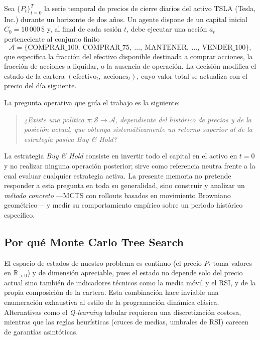 Sea $\{P_t\}_{t=0}^{T}$ la serie temporal de precios de cierre diarios del activo TSLA (Tesla, Inc.) durante un horizonte de dos años. Un agente dispone de un capital inicial $C_0 = 10\,000$\,\$ y, al final de cada sesión $t$, debe ejecutar una acción $a_t$ perteneciente al conjunto finito
\[
    \mathcal{A} = \{\text{COMPRAR\_100},\ \text{COMPRAR\_75},\ \ldots,\ \text{MANTENER},\ \ldots,\ \text{VENDER\_100}\},
\]
que especifica la fracción del efectivo disponible destinada a comprar acciones, la fracción de acciones a liquidar, o la ausencia de operación. La decisión modifica el estado de la cartera $(\text{efectivo}_t,\ \text{acciones}_t)$, cuyo valor total se actualiza con el precio del día siguiente.

La pregunta operativa que guía el trabajo es la siguiente:

\begin{quote}
    \itshape ¿Existe una política $\pi: \mathcal{S} \to \mathcal{A}$, dependiente del histórico de precios y de la posición actual, que obtenga sistemáticamente un retorno superior al de la estrategia pasiva \emph{Buy \& Hold}?
\end{quote}

La estrategia \emph{Buy \& Hold} consiste en invertir todo el capital en el activo en $t=0$ y no realizar ninguna operación posterior; sirve como referencia neutra frente a la cual evaluar cualquier estrategia activa. La presente memoria no pretende responder a esta pregunta en toda su generalidad, sino construir y analizar un \emph{método concreto} ---MCTS con rollouts basados en movimiento Browniano geométrico--- y medir su comportamiento empírico sobre un periodo histórico específico.

\subsection{Por qué Monte Carlo Tree Search}
\label{subsec:por-que-mcts}

El espacio de estados de nuestro problema es continuo (el precio $P_t$ toma valores en $\mathbb{R}_{>0}$) y de dimensión apreciable, pues el estado no depende solo del precio actual sino también de indicadores técnicos como la media móvil y el RSI, y de la propia composición de la cartera. Esta combinación hace inviable una enumeración exhaustiva al estilo de la programación dinámica clásica. Alternativas como el \emph{Q-learning} tabular requieren una discretización costosa, mientras que las reglas heurísticas (cruces de medias, umbrales de RSI) carecen de garantías asintóticas.

